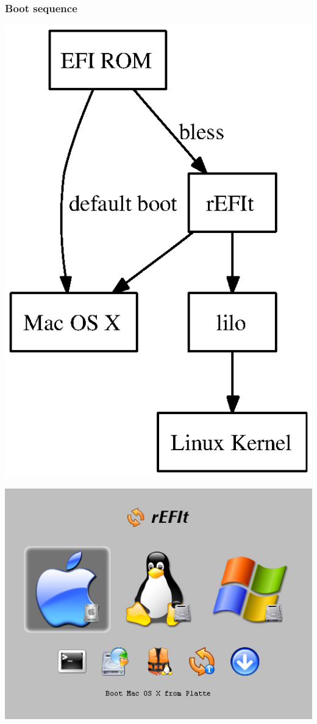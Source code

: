 \documentclass[cjk,dvipdfmx]{beamer}
\begin{document}
\begin{frame}
\frametitle{Boot sequence}
\begin{minipage}[t]{0.4\hsize}
\includegraphics[height=1\hsize]{image200607/bootchain.ps}
\end{minipage}
\begin{minipage}[t]{0.58\hsize}
\includegraphics[width=1\hsize]{image200607/screen1.png}
\end{minipage}
\end{frame}
\end{document}
